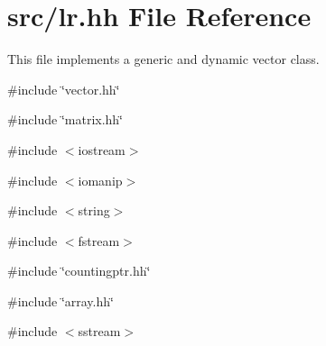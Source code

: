 \hypertarget{lr_8hh}{
\section{src/lr.hh File Reference}
\label{lr_8hh}
}


This file implements a generic and dynamic vector class.  


{\ttfamily \#include \char`\"{}vector.hh\char`\"{}}\par
{\ttfamily \#include \char`\"{}matrix.hh\char`\"{}}\par
{\ttfamily \#include $<$iostream$>$}\par
{\ttfamily \#include $<$iomanip$>$}\par
{\ttfamily \#include $<$string$>$}\par
{\ttfamily \#include $<$fstream$>$}\par
{\ttfamily \#include \char`\"{}countingptr.hh\char`\"{}}\par
{\ttfamily \#include \char`\"{}array.hh\char`\"{}}\par
{\ttfamily \#include $<$sstream$>$}\par
